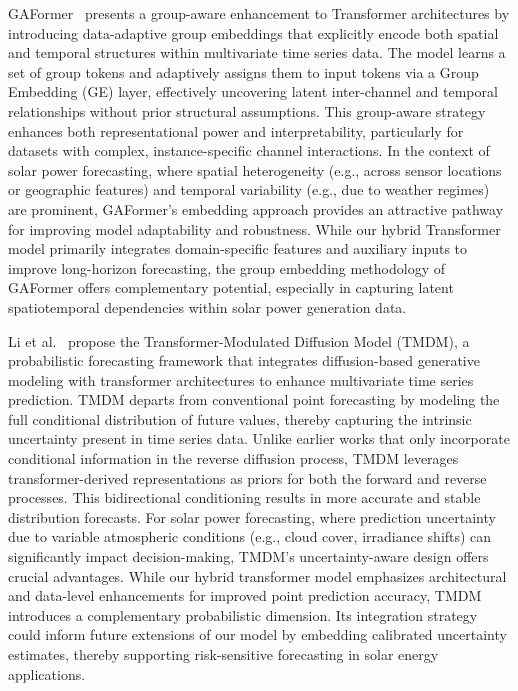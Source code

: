 \documentclass[12pt]{uomthesis}
\begin{document}
GAFormer~\cite{xiao2024gaformer} presents a group-aware enhancement to Transformer architectures by introducing data-adaptive group embeddings that explicitly encode both spatial and temporal structures within multivariate time series data. The model learns a set of group tokens and adaptively assigns them to input tokens via a Group Embedding (GE) layer, effectively uncovering latent inter-channel and temporal relationships without prior structural assumptions. This group-aware strategy enhances both representational power and interpretability, particularly for datasets with complex, instance-specific channel interactions. In the context of solar power forecasting, where spatial heterogeneity (e.g., across sensor locations or geographic features) and temporal variability (e.g., due to weather regimes) are prominent, GAFormer's embedding approach provides an attractive pathway for improving model adaptability and robustness. While our hybrid Transformer model primarily integrates domain-specific features and auxiliary inputs to improve long-horizon forecasting, the group embedding methodology of GAFormer offers complementary potential, especially in capturing latent spatiotemporal dependencies within solar power generation data.

Li et al.~\cite{li2024transformer} propose the Transformer-Modulated Diffusion Model (TMDM), a probabilistic forecasting framework that integrates diffusion-based generative modeling with transformer architectures to enhance multivariate time series prediction. TMDM departs from conventional point forecasting by modeling the full conditional distribution of future values, thereby capturing the intrinsic uncertainty present in time series data. Unlike earlier works that only incorporate conditional information in the reverse diffusion process, TMDM leverages transformer-derived representations as priors for both the forward and reverse processes. This bidirectional conditioning results in more accurate and stable distribution forecasts. For solar power forecasting, where prediction uncertainty due to variable atmospheric conditions (e.g., cloud cover, irradiance shifts) can significantly impact decision-making, TMDM’s uncertainty-aware design offers crucial advantages. While our hybrid transformer model emphasizes architectural and data-level enhancements for improved point prediction accuracy, TMDM introduces a complementary probabilistic dimension. Its integration strategy could inform future extensions of our model by embedding calibrated uncertainty estimates, thereby supporting risk-sensitive forecasting in solar energy applications.
\end{document}
